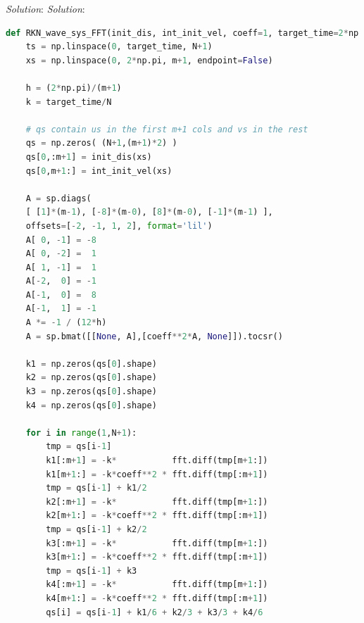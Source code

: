 \documentclass[final,oneside,onecolumn]{article}
\begin{document}
\begin{enumerate}
\begin{enumerate}
\textit{Solution}:
\textit{Solution}:
\begin{lstlisting}[language=Python]
def RKN_wave_sys_FFT(init_dis, int_init_vel, coeff=1, target_time=2*np.pi, N=10, m=16):
	ts = np.linspace(0, target_time, N+1)
	xs = np.linspace(0, 2*np.pi, m+1, endpoint=False)
	
	h = (2*np.pi)/(m+1)
	k = target_time/N
	
	# qs contain us in the first m+1 cols and vs in the rest
	qs = np.zeros( (N+1,(m+1)*2) )
	qs[0,:m+1] = init_dis(xs)
	qs[0,m+1:] = int_init_vel(xs)
	
	A = sp.diags(
	[ [1]*(m-1), [-8]*(m-0), [8]*(m-0), [-1]*(m-1) ], 
	offsets=[-2, -1, 1, 2], format='lil')
	A[ 0, -1] = -8
	A[ 0, -2] =  1
	A[ 1, -1] =  1
	A[-2,  0] = -1
	A[-1,  0] =  8
	A[-1,  1] = -1
	A *= -1 / (12*h)
	A = sp.bmat([[None, A],[coeff**2*A, None]]).tocsr()
	
	k1 = np.zeros(qs[0].shape)
	k2 = np.zeros(qs[0].shape)
	k3 = np.zeros(qs[0].shape)
	k4 = np.zeros(qs[0].shape)
	
	for i in range(1,N+1):
		tmp = qs[i-1]
		k1[:m+1] = -k*           fft.diff(tmp[m+1:])
		k1[m+1:] = -k*coeff**2 * fft.diff(tmp[:m+1])
		tmp = qs[i-1] + k1/2
		k2[:m+1] = -k*           fft.diff(tmp[m+1:])
		k2[m+1:] = -k*coeff**2 * fft.diff(tmp[:m+1])
		tmp = qs[i-1] + k2/2
		k3[:m+1] = -k*           fft.diff(tmp[m+1:])
		k3[m+1:] = -k*coeff**2 * fft.diff(tmp[:m+1])
		tmp = qs[i-1] + k3
		k4[:m+1] = -k*           fft.diff(tmp[m+1:])
		k4[m+1:] = -k*coeff**2 * fft.diff(tmp[:m+1])
		qs[i] = qs[i-1] + k1/6 + k2/3 + k3/3 + k4/6
	

\end{lstlisting}
\end{enumerate}
\end{enumerate}
\end{document}
